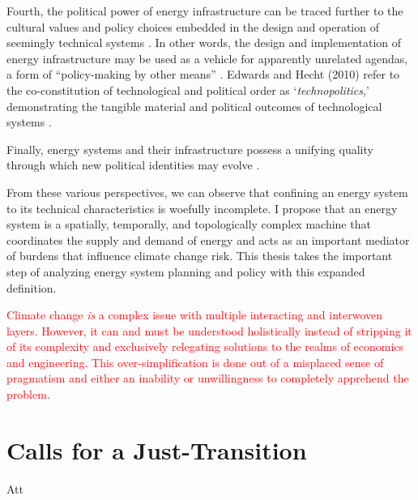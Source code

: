     Fourth, the political power of energy infrastructure can be traced further to the cultural values and policy choices embedded in the design and operation of seemingly technical systems \cite{bridge_energy_2018}. In other words, the 
    design and implementation of energy infrastructure may be used as a vehicle for 
    apparently unrelated agendas, a form of ``policy-making by other means'' 
    \cite{bridge_energy_2018, clausewitz_chapter_1918}. Edwards and Hecht (2010) 
    refer to the co-constitution of technological and political order as 
    `\textit{technopolitics},' demonstrating the tangible material and political 
    outcomes of technological systems \cite{edwards_history_2010}.

    Finally, energy systems and their infrastructure possess a unifying quality
    through which new political identities may evolve \cite{bridge_energy_2018}.

    From these various perspectives, we can observe that confining an energy system
    to its technical characteristics is woefully incomplete. I propose that
    an energy system is a spatially, temporally, and topologically complex machine that coordinates the supply and demand of energy and acts as an important mediator of burdens that influence climate change risk. This thesis takes the 
    important step of analyzing energy system planning and policy with this 
    expanded definition.
    

    \textcolor{red}{Climate change \textit{is} a complex issue with multiple interacting and interwoven layers. However, it can and must be understood holistically instead of stripping it of its complexity and exclusively relegating solutions to the realms of economics and engineering. This over-simplification is done out of a misplaced sense of pragmatism and either an
    inability or unwillingness to completely apprehend the problem.}
    
\noindent\hrulefill


    

\section{Calls for a Just-Transition}

Att